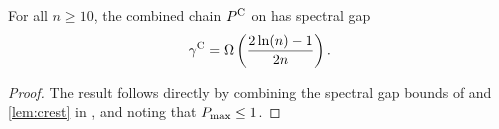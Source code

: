 \setcounter{theorem}{1}
\begin{theorem}
  For all $n \geq 10$, the combined chain $P^{\mathrm{C}}$ on \ising{} has spectral gap
  \begin{align*}
    \gamma^{\mathrm{C}} = \Omega\left( \displaystyle\frac{2\ln(n) - 1}{2n} \right).
  \end{align*}
\end{theorem}

\begin{proof}
  The result follows directly by combining the spectral gap bounds of  and \ref{lem:crest} in , and noting that $P_{\textrm{max}} \leq 1$.
\end{proof}